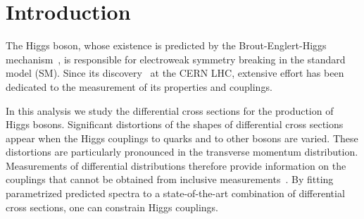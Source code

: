 \section{Introduction}
\label{sec:introduction}

The Higgs boson, whose existence is predicted by the Brout-Englert-Higgs mechanism~\cite{Higgs:1964pj,Englert:1964et,Guralnik:1964eu}, is responsible for electroweak symmetry breaking in the standard model (SM).
% 
Since its discovery~\cite{Aad:2012tfa,Chatrchyan:2012xdj} at the CERN LHC, extensive effort has been dedicated to the measurement of its properties and couplings.

In this analysis we study the differential cross sections for the production of Higgs bosons. 
% 
Significant distortions of the shapes of differential cross sections appear when the Higgs couplings to quarks and to other bosons are varied.
% 
These distortions are particularly pronounced in the transverse momentum distribution.
% 
Measurements of differential distributions therefore provide information on the couplings that cannot be obtained from inclusive measurements~\cite{Khachatryan:2016vau,Aad:2015gba,Khachatryan:2014jba,ATLAS:2017ovn,CMS:2018lkl}.
% 
By fitting parametrized predicted spectra to a state-of-the-art combination of differential cross sections, one can constrain Higgs couplings.


